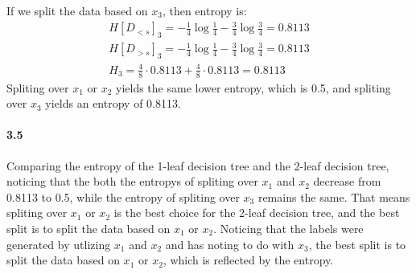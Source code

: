 \documentclass[11pt]{article}
\begin{document}
If we split the data based on $x_3$, then entropy is:
\begin{equation}
    \begin{split}
        H[D_{<s}]_3 = -\frac{1}{4}\log \frac{1}{4} - \frac{3}{4}\log \frac{3}{4} = 0.8113 \\ 
        H[D_{>s}]_3 = -\frac{1}{4}\log \frac{1}{4} - \frac{3}{4}\log \frac{3}{4} = 0.8113 \\
        H_3 = \frac{4}{8} \cdot 0.8113 + \frac{4}{8} \cdot 0.8113 = 0.8113
    \end{split}
\end{equation}
Spliting over $x_1$ or $x_2$ yields the same lower entropy, which is 0.5, and spliting over $x_3$ yields an entropy of 0.8113.
\paragraph{3.5}
Comparing the entropy of the 1-leaf decision tree and the 2-leaf decision tree, noticing that the both the entropys of spliting over $x_1$ and $x_2$ decrease from 0.8113 to 0.5, while the entropy of spliting over $x_3$ remains the same. That means spliting over $x_1$ or $x_2$ is the best choice for the 2-leaf decision tree, and the best split is to split the data based on $x_1$ or $x_2$.
Noticing that the labels were generated by utlizing $x_1$ and $x_2$ and has noting to do with $x_3$, the best split is to split the data based on $x_1$ or $x_2$, which is reflected by the entropy.
\end{document}
